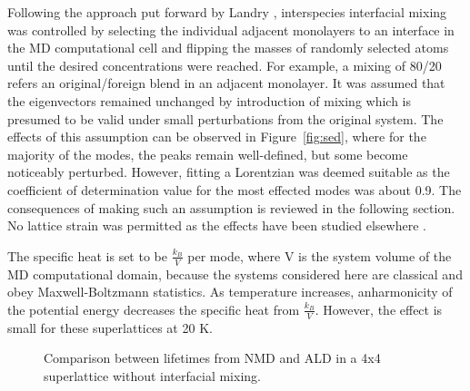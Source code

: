 Following the approach put forward by Landry \cite{PhysRevB.79.075316}, interspecies interfacial mixing was controlled by selecting the individual adjacent monolayers to an interface in the MD computational cell and flipping the masses of randomly selected atoms until the desired concentrations were reached. For example, a mixing of 80/20 refers an original/foreign blend in an adjacent monolayer. It was assumed that the eigenvectors remained unchanged by introduction of mixing which is presumed to be valid under small perturbations from the original system. The effects of this assumption can be observed in Figure~\ref{fig:sed}, where for the majority of the modes, the peaks remain well-defined, but some become noticeably perturbed. However, fitting a Lorentzian was deemed suitable as the coefficient of determination value for the most effected modes was about 0.9. The consequences of making such an assumption is reviewed in the following section. No lattice strain was permitted as the effects have been studied elsewhere \cite{PhysRevB.72.174302}.

The specific heat is set to be $\frac{k_B}{V}$ per mode, where V is the system volume of the MD computational domain, because the systems considered here are classical and obey Maxwell-Boltzmann statistics. As temperature increases, anharmonicity of the potential energy decreases the specific heat from $\frac{k_B}{V}$. However, the effect is small for these superlattices at 20 K.




\begin{figure}%
\begin{center}
\renewcommand{\figure}{Fig.}
\caption{Comparison between lifetimes from NMD and ALD in a 4x4 superlattice without interfacial mixing.}
\label{FIG:NMD_v_ALD}
\end{center}
\end{figure}


